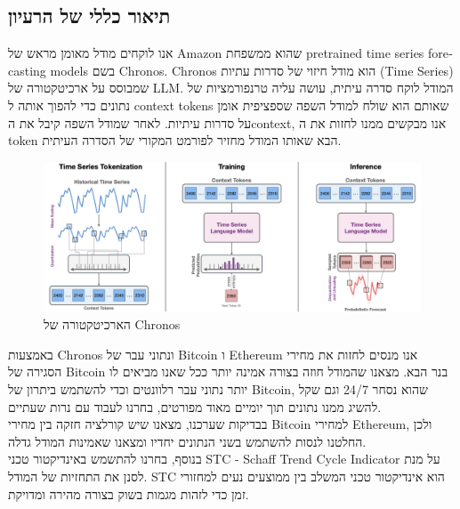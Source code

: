 \documentclass[a4paper,11pt]{article}
\title{\te{Chronos: Learning the Language of Time Series}}
\author{מתן לבינטוב \and יובל שוורץ \and גבריאל מגידוב \and שי קרנצברג}
\date{}
\newcommand{\te}[1]{\textenglish{#1}}
\begin{document}
\begin{RTL}
    
\maketitle
\section{תיאור כללי של הרעיון}
אנו לוקחים מודל מאומן מראש של \te{Amazon} שהוא ממשפחת \te{pretrained time series forecasting models} בשם \te{Chronos}. \te{Chronos} הוא מודל חיזוי של סדרות עתיות (\te{Time Series}) שמבוסס על ארכיטקטורה של \te{LLM}. המודל לוקח סדרה עיתית, עושה עליה טרנפורמציות של נתונים כדי להפוך אותה ל \te{context tokens} שאותם הוא שולח למודל השפה שספציפית אומן על סדרות עיתיות. לאחר שמודל השפה קיבל את ה\te{context}, אנו מבקשים ממנו לחזות את ה \te{token} הבא שאותו המודל מחזיר לפורמט המקורי של הסדרה העיתית.
\begin{figure}[H]
    \centering
    \includegraphics[width=1\textwidth]{Chronos Pretrained Model.png}
    \caption{הארכיטקטורה של \te{Chronos}}
\end{figure}
באמצעות \te{Chronos} ונתוני עבר של \te{Bitcoin} ו \te{Ethereum} אנו מנסים לחזות את מחירי הסגירה של \te{Bitcoin} בנר הבא. מצאנו שהמודל חוזה בצורה אמינה יותר ככל שאנו מביאים לו יותר נתוני עבר רלוונטים וכדי להשתמש ביתרון של \te{Bitcoin}, שהוא נסחר 24/7 וגם שקל להשיג ממנו נתונים תוך יומיים מאוד מפורטים, בחרנו לעבוד עם נרות שעתיים.
\\
בבדיקות שערכנו, מצאנו שיש קורלציה חזקה בין מחירי \te{Bitcoin} למחירי \te{Ethereum}, ולכן החלטנו לנסות להשתמש בשני הנתונים יחדיו ומצאנו שאמינות המודל גדלה.
\\
בנוסף, בחרנו להתשמש באינדיקטור טכני \textenglish{STC - Schaff Trend Cycle Indicator} על מנת לסנן את התחזיות של המודל. \te{STC} הוא אינדיקטור טכני המשלב בין ממוצעים נעים למחזורי זמן כדי לזהות מגמות בשוק בצורה מהירה ומדויקת.
\newpage

\end{RTL}
\end{document}
